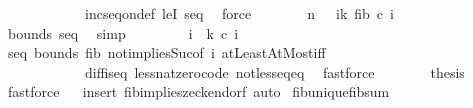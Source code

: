 \begin{isabellebody}
\ \ \ \ \ \ \ \ \ \ \ \ inc{\isacharunderscore}{\kern0pt}seq{\isacharunderscore}{\kern0pt}on{\isacharunderscore}{\kern0pt}def\ leI\ seq\ \isamarkupfalse%
\ force\isanewline
\ \ \ \ \isamarkupfalse%
\ \isamarkupfalse%
\ {\isachardoublequoteopen}n\ {\isacharequal}{\kern0pt}\ {\isacharparenleft}{\kern0pt}{\isasymSum}\ i{\isacharequal}{\kern0pt}{}{\isachardot}{\kern0pt}{\isachardot}{\kern0pt}k{\isacharplus}{\kern0pt}{}{\isachardot}{\kern0pt}\ fib\ {\isacharparenleft}{\kern0pt}{\isacharquery}{\kern0pt}c{\isacharprime}{\kern0pt}\ i{\isacharparenright}{\kern0pt}{\isacharparenright}{\kern0pt}{\isachardoublequoteclose}\ \isanewline
\ \ \ \ \ \ \isamarkupfalse%
\ bounds\ seq\ \isamarkupfalse%
\ simp\isanewline
\ \ \ \ \isamarkupfalse%
\ \isamarkupfalse%
\ {\isachardoublequoteopen}{\isasymforall}\ i\ {\isasymin}\ {\isacharbraceleft}{\kern0pt}{}{\isachardot}{\kern0pt}{\isachardot}{\kern0pt}k{\isacharplus}{\kern0pt}{}{\isacharbraceright}{\kern0pt}{\isachardot}{\kern0pt}\ {\isacharquery}{\kern0pt}c{\isacharprime}{\kern0pt}\ i\ {\isasymge}\ {}{\isachardoublequoteclose}\ \isanewline
\ \ \ \ \ \ \isamarkupfalse%
\ seq\ bounds\ fib{}\ not{}{\isacharunderscore}{\kern0pt}implies{\isacharunderscore}{\kern0pt}Suc{\isacharbrackleft}{\kern0pt}of\ i{\isacharbrackright}{\kern0pt}\ atLeastAtMost{\isacharunderscore}{\kern0pt}iff\ \isanewline
\ \ \ \ \ \ \ \ \ \ \ \ diff{\isacharunderscore}{\kern0pt}is{\isacharunderscore}{\kern0pt}{}{\isacharunderscore}{\kern0pt}eq{\isacharprime}{\kern0pt}\ less{\isacharunderscore}{\kern0pt}nat{\isacharunderscore}{\kern0pt}zero{\isacharunderscore}{\kern0pt}code\ not{\isacharunderscore}{\kern0pt}less{\isacharunderscore}{\kern0pt}eq{\isacharunderscore}{\kern0pt}eq\ \isamarkupfalse%
\ fastforce\isanewline
\ \ \ \ \isamarkupfalse%
\ \isamarkupfalse%
\ {\isacharquery}{\kern0pt}thesis\ \isamarkupfalse%
\ fastforce\isanewline
\ \ \isamarkupfalse%
{\isacharparenleft}{\kern0pt}insert\ fib{\isacharunderscore}{\kern0pt}implies{\isacharunderscore}{\kern0pt}zeckendorf{\isacharcomma}{\kern0pt}\ auto{\isacharparenright}{\kern0pt}\isanewline
{}\isamarkupfalse%
%
\endisatagproof
{\isafoldproof}%
%
\isadelimproof
\isanewline
%
\endisadelimproof
\isanewline
{}\isamarkupfalse%
\ fib{\isacharunderscore}{\kern0pt}unique{\isacharunderscore}{\kern0pt}fib{\isacharunderscore}{\kern0pt}sum{\isacharcolon}{\kern0pt}\isanewline

\end{isabellebody}
